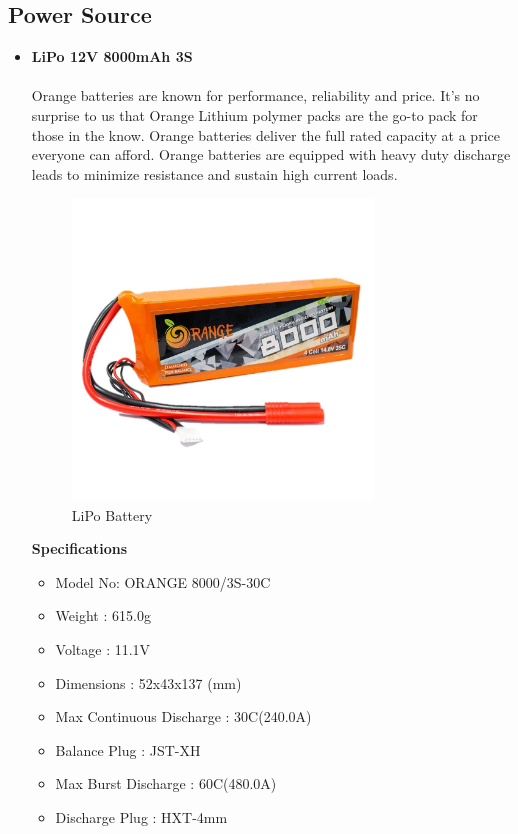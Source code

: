\newpage

\subsection{Power Source}

\begin{itemize}[wide, labelwidth=!, labelindent=0pt]
    \item \textbf{LiPo 12V 8000mAh 3S}
    \vspace{-0.5cm}
    \paragraph{}Orange batteries are known for performance, reliability and price. It’s no surprise to us that Orange Lithium polymer packs are the go-to pack for those in the know. Orange batteries deliver the full rated capacity at a price everyone can afford. Orange batteries are equipped with heavy duty discharge leads to minimize resistance and sustain high current loads.
    
    \begin{figure}[H]
    \centering
    \includegraphics[width = 8cm]{project/images/battery.jpg}
    \caption{LiPo Battery}
    \end{figure}
    
    \begin{center}{\textbf{Specifications}}\end{center}
    
    \begin{itemize}
        \item Model No: ORANGE 8000/3S-30C
        \item Weight : 615.0g
        \item Voltage : 11.1V
        \item Dimensions : 52x43x137 (mm)
        \item Max Continuous Discharge : 30C(240.0A)
        \item Balance Plug : JST-XH
        \item Max Burst Discharge : 60C(480.0A)
        \item Discharge Plug : HXT-4mm
    \end{itemize}

\end{itemize}


